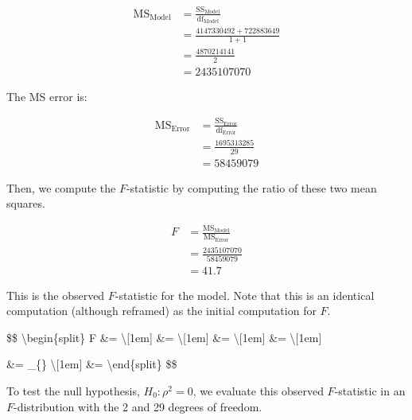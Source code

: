 \documentclass[]{book}
\begin{document}
\[
\begin{split}
\mathrm{MS}_{\mathrm{Model}} &= \frac{\mathrm{SS}_{\mathrm{Model}}}{\mathrm{df}_{\mathrm{Model}}} \\
&= \frac{4147330492 + 722883649}{1 + 1} \\
&= \frac{4870214141}{2} \\
&= 2435107070
\end{split}
\]

The MS error is:

\[
\begin{split}
\mathrm{MS}_{\mathrm{Error}} &= \frac{\mathrm{SS}_{\mathrm{Error}}}{\mathrm{df}_{\mathrm{Error}}} \\
&= \frac{1695313285 }{29} \\
&= 58459079
\end{split}
\]

Then, we compute the \(F\)-statistic by computing the ratio of these two mean squares.

\[
\begin{split}
F &= \frac{\mathrm{MS}_{\mathrm{Model}}}{\mathrm{MS}_{\mathrm{Error}}} \\
&= \frac{2435107070}{58459079} \\
&= 41.7
\end{split}
\]

This is the observed \(F\)-statistic for the model. Note that this is an identical computation (although reframed) as the initial computation for \(F\).

\$\$
\textbackslash{}begin\{split\}
F \&=  \times {} \textbackslash{}{[}1em{]}
\&=  \times {} \textbackslash{}{[}1em{]}
\&=  \times {} \textbackslash{}{[}1em{]}
\&=  \times {} \textbackslash{}{[}1em{]}

\&= \_\{\} \times {}\textbackslash{}{[}1em{]}
\&= 
\textbackslash{}end\{split\}
\$\$

To test the null hypothesis, \(H_0:\rho^2=0\), we evaluate this observed \(F\)-statistic in an \(F\)-distribution with the 2 and 29 degrees of freedom.
\end{document}
